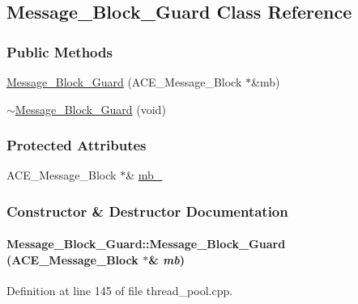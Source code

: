 \hypertarget{classMessage__Block__Guard}{
\subsection{Message\_\-Block\_\-Guard Class Reference}
\label{classMessage__Block__Guard}
}
\subsubsection*{Public Methods}
\begin{CompactItemize}
\item 
\hyperlink{classMessage__Block__Guard_Message__Block__Guarda0}{Message\_\-Block\_\-Guard} (ACE\_\-Message\_\-Block $\ast$\&mb)
\item 
\hyperlink{classMessage__Block__Guard_Message__Block__Guarda1}{$\sim$Message\_\-Block\_\-Guard} (void)
\end{CompactItemize}
\subsubsection*{Protected Attributes}
\begin{CompactItemize}
\item 
ACE\_\-Message\_\-Block $\ast$\& \hyperlink{classMessage__Block__Guard_Message__Block__Guardn0}{mb\_\-}
\end{CompactItemize}


\subsubsection{Constructor \& Destructor Documentation}
\hypertarget{classMessage__Block__Guard_Message__Block__Guarda0}{
\paragraph[Message\_\-Block\_\-Guard]{\setlength{\rightskip}{0pt plus 5cm}Message\_\-Block\_\-Guard::Message\_\-Block\_\-Guard (ACE\_\-Message\_\-Block $\ast$\& {\em mb})}\hfill}
\label{classMessage__Block__Guard_Message__Block__Guarda0}




Definition at line 145 of file thread\_\-pool.cpp.

